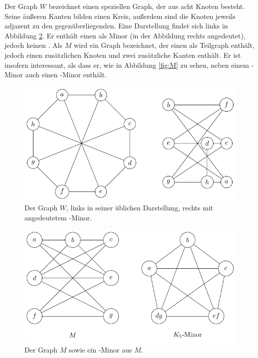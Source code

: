 Der Graph $W$ bezeichnet einen speziellen Graph, der aus acht Knoten besteht.
Seine äußeren Kanten bilden einen Kreis, außerdem sind die Knoten jeweils adjazent zu den gegenüberliegenden. Eine Darstellung findet sich links in Abbildung \ref{fig:W}.
Er enthält einen \kdd als Minor (in der Abbildung rechts angedeutet), jedoch keinen \kf.
Als $M$ wird ein Graph bezeichnet, der einen \kdd als Teilgraph enthält, jedoch einen zusätzlichen Knoten und zwei zusätzliche Kanten enthält.
Er ist insofern interessant, als dass er, wie in Abbildung \ref{fig:M} zu sehen, neben einem \kdd-Minor auch einen \kf-Minor enthält.
\begin{figure}[H]
  \centering
  \includegraphics[keepaspectratio]{bilder/W.pdf}
  \caption{Der Graph $W$, links in seiner üblichen Darstellung, rechts mit angedeutetem \kdd-Minor.}
  \label{fig:W}
\end{figure}

\begin{figure}[H]
  \centering
  \includegraphics[keepaspectratio]{bilder/M.pdf}
  \caption{Der Graph $M$ sowie ein \kf-Minor aus $M$.}
  \label{fig:W}
\end{figure}

